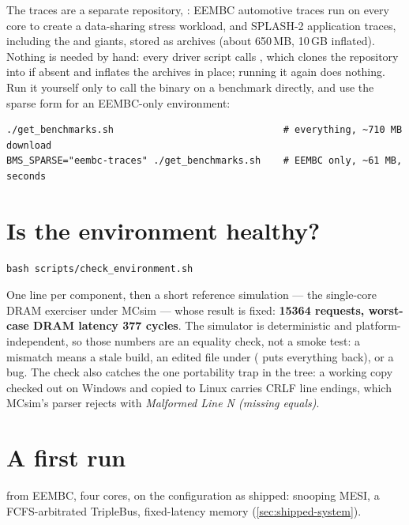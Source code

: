 The traces are a separate repository, : EEMBC automotive traces
run on every core to create a data-sharing stress workload, and SPLASH-2 application traces,
including the  and  giants, stored as  archives (about
650\,MB, 10\,GB inflated). Nothing is needed by hand: every driver script calls
, which clones the repository into  if absent and inflates
the archives in place; running it again does nothing. Run it yourself only to call the binary on a benchmark
directly, and use the sparse form for an EEMBC-only environment:

\begin{lstlisting}[style=shell]
./get_benchmarks.sh                              # everything, ~710 MB download
BMS_SPARSE="eembc-traces" ./get_benchmarks.sh    # EEMBC only, ~61 MB, seconds
\end{lstlisting}

\section{Is the environment healthy?}

\begin{lstlisting}[style=shell]
bash scripts/check_environment.sh
\end{lstlisting}

One \code{[PASS]} line per component, then a short reference simulation --- the single-core DRAM
exerciser under MCsim --- whose result is fixed: \textbf{15364 requests, worst-case DRAM latency
377 cycles}. The simulator is deterministic and platform-independent, so those numbers are an
equality check, not a smoke test: a mismatch means a stale build, an edited file under
 ( puts everything back), or a bug.
The check also catches the one portability trap in the tree: a working copy checked out on
Windows and copied to Linux carries CRLF line endings, which MCsim's  parser rejects
with \emph{Malformed Line N (missing equals)}.

\section{A first run}

 from EEMBC, four cores, on the configuration as shipped: snooping MESI, a
FCFS-arbitrated TripleBus, fixed-latency memory (\cref{sec:shipped-system}).


